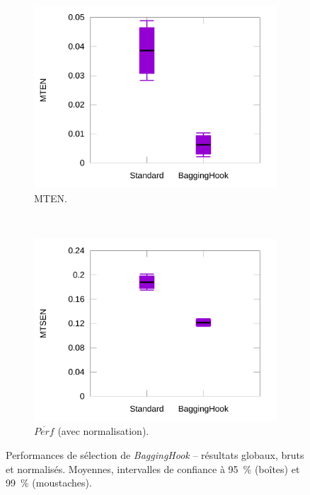 \begin{figure}[htb]
\begin{subfigure}[t]{0.49\textwidth}
			\includegraphics[width=\textwidth]{figures/ch5/baggingNormErrors}
			\caption{MTEN.}
			\label{fig:baggingNormErrors}
		\end{subfigure}
				~
		\begin{subfigure}[t]{0.49\textwidth}
			\centering
			\includegraphics[width=\textwidth]{figures/ch5/baggingNormProducts}
			\caption{$\overline{Perf}$ (avec normalisation).}
			\label{fig:baggingNormProducts}
		\end{subfigure}
		\caption[\emph{BaggingHook} -- résultats]{Performances de sélection de \emph{BaggingHook} -- résultats globaux, bruts et normalisés. Moyennes, intervalles de confiance à 95~\%{} (boîtes) et 99~\%{} (moustaches).}
		\label{fig:baggingHookAllRes}
	\end{figure}
	
